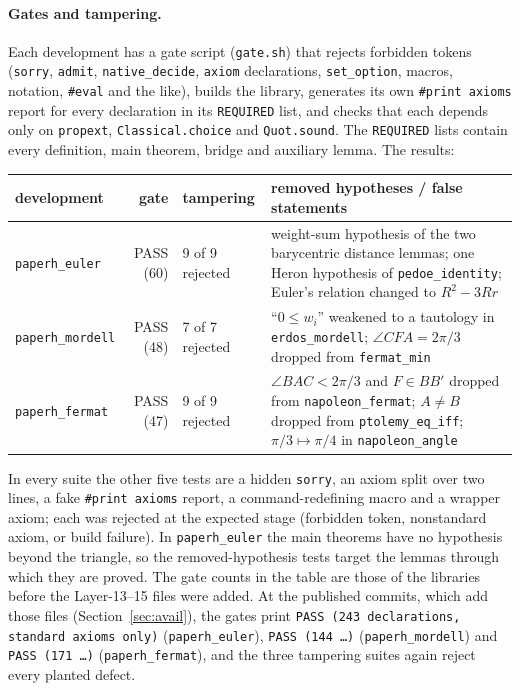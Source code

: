 \documentclass[11pt]{article}
\theoremstyle{definition}
\theoremstyle{remark}
\newcommand{\lean}[1]{\texttt{#1}}
\begin{document}
\paragraph{Gates and tampering.} Each development has a gate script (\lean{gate.sh}) that rejects
forbidden tokens (\lean{sorry}, \lean{admit}, \lean{native\_decide}, \lean{axiom} declarations,
\lean{set\_option}, macros, notation, \lean{\#eval} and the like), builds the library, generates its
own \lean{\#print axioms} report for every declaration in its \lean{REQUIRED} list, and checks that
each depends only on \lean{propext}, \lean{Classical.choice} and \lean{Quot.sound}. The \lean{REQUIRED}
lists contain every definition, main theorem, bridge and auxiliary lemma. The results:
\begin{center}\small
\begin{tabular}{@{}l r l p{6.6cm}@{}}
\toprule
development & gate & tampering & removed hypotheses / false statements\\
\midrule
\lean{paperh\_euler} & PASS (60) & 9 of 9 rejected & weight-sum hypothesis of the two barycentric
distance lemmas; one Heron hypothesis of \lean{pedoe\_identity}; Euler's relation changed to
$R^2-3Rr$\\
\lean{paperh\_mordell} & PASS (48) & 7 of 7 rejected & ``$0\le w_i$'' weakened to a tautology in
\lean{erdos\_mordell}; $\angle CFA=2\pi/3$ dropped from \lean{fermat\_min}\\
\lean{paperh\_fermat} & PASS (47) & 9 of 9 rejected & $\angle BAC<2\pi/3$ and $F\in BB'$ dropped from
\lean{napoleon\_fermat}; $A\ne B$ dropped from \lean{ptolemy\_eq\_iff}; $\pi/3\mapsto\pi/4$ in
\lean{napoleon\_angle}\\
\bottomrule
\end{tabular}
\end{center}
In every suite the other five tests are a hidden \lean{sorry}, an axiom split over two lines, a fake
\lean{\#print axioms} report, a command-redefining macro and a wrapper axiom; each was rejected at the
expected stage (forbidden token, nonstandard axiom, or build failure). In \lean{paperh\_euler} the
main theorems have no hypothesis beyond the triangle, so the removed-hypothesis tests target the
lemmas through which they are proved. The gate counts in the table are those of the libraries
before the Layer-13--15 files were added. At the published commits, which add those files
(Section~\ref{sec:avail}), the gates print \lean{PASS (243 declarations, standard axioms only)}
(\lean{paperh\_euler}), \lean{PASS (144 \ldots)} (\lean{paperh\_mordell}) and \lean{PASS (171 \ldots)}
(\lean{paperh\_fermat}), and the three tampering suites again reject every planted defect.
\end{document}
